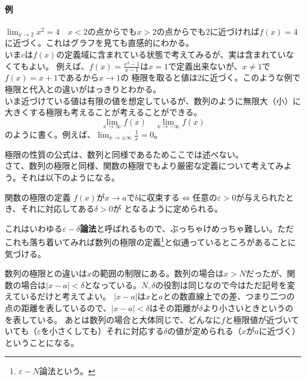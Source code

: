 \documentclass[a4j,dvipdfmx]{jsarticle}
\begin{document}
                \paragraph{例}$\displaystyle\lim_{x\to 2}x^2 = 4$　$x<2$の点からでも$x>2$の点からでも$2$に近づければ$f(x)=4$に近づく。これはグラフを見ても直感的にわかる。\\
                
                いま$c$は$f(x)$の定義域に含まれている状態で考えてみるが、実は含まれていなくてもよい。
                例えば、$f(x)=\frac{x^2-1}{x-1}$は$x=1$で定義出来ないが、$x\neq 1$で$f(x)=x+1$であるから$x\to 1$の
                極限を取ると値は$2$に近づく。このような例で極限と代入との違いがはっきりとわかる。\\

                いま近づけている値は有限の値を想定しているが、数列のように無限大（小）に大きくする極限も考えることが考えることができる。
                \begin{equation}
                    \lim_{x\to\infty}f(x)\quad \lim_{x\to-\infty}f(x)
                \end{equation}
                のように書く。例えば、$\displaystyle\lim_{x\to \pm\infty}\frac{1}{x}=0$。
                
                \noindent
                極限の性質の公式は、数列と同様であるためここでは述べない。\\

                さて、数列の極限と同様、関数の極限でもより厳密な定義について考えてみよう。それは以下のようになる。
                \begin{itembox}{関数の極限の定義}
                    $f(x)$が$x\to a$で$b$に収束する$\Leftrightarrow$任意の$\varepsilon>0$が与えられたとき、それに対応してある$\delta > 0$が
                    となるように定められる。
                \end{itembox}
                これはいわゆる\textbf{$\varepsilon-\delta$論法}と呼ばれるもので、ぶっちゃけめっちゃ難しい。ただこれも落ち着いてみれば数列の極限の定義\footnote{$\varepsilon-N$論法という。}と似通っているところがあることに気づける。

                数列の極限との違いは$x$の範囲の制限にある。数列の場合は$x>N$だったが、関数の場合は$|x-a|<\delta$となっている。$N,\delta$の役割は同じなので今はただ記号を変えているだけと考えてよい。
                $|x-a|$は$x$と$a$との数直線上での差、つまり二つの点の距離を表しているので、$|x-a|<\delta$はその距離が$\delta$より小さいときというのを表している。
                あとは数列の場合と大体同じで、どんなに$f$と極限値が近づいていても（$\varepsilon$を小さくしても）それに対応する$\delta$の値が定められる（$x$が$a$に近づく）ということになる。
                \newpage
\end{document}
